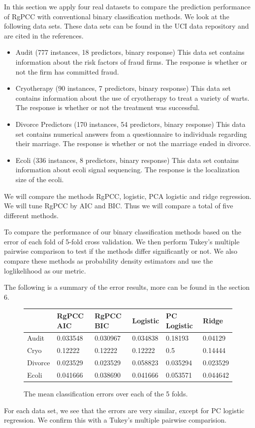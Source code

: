 \documentclass[main.tex]{subfiles}
\begin{document}
In this section we apply four real datasets to compare the prediction performance of RgPCC with conventional binary classification methods. We look at the following data sets. These data sets can be found in the UCI data repository and are cited in the references.
\begin{itemize}
	\item Audit (777 instances, 18 predictors, binary response) This data set contains information about the risk factors of fraud firms. The response is whether or not the firm has committed fraud. \cite{audit}
    \item Cryotherapy (90 instances, 7 predictors, binary response) This data set contains information about the use of cryotherapy to treat a variety of warts. The response is whether or not the treatment was successful. \cite{cryo}
    \item Divorce Predictors (170 instances, 54 predictors, binary response) This data set contains numerical answers from a questionnaire to individuals regarding their marriage. The response is whether or not the marriage ended in divorce. \cite{divorce}
    \item Ecoli (336 instances, 8 predictors, binary response) This data set contains information about ecoli signal sequencing. The response is the localization size of the ecoli. \cite{ecoli}
\end{itemize}

We will compare the methods RgPCC, logistic, PCA logistic and ridge regression. We will tune RgPCC by AIC and BIC. Thus we will compare a total of five different methods. 

To compare the performance of our binary classification methods based on the error of each fold of 5-fold cross validation. We then perform Tukey's multiple pairwise comparison to test if the methods differ significantly or not. We also compare these methods as probability density estimators and use the loglikelihood as our metric.

The following is a summary of the error results, more can be found in the section 6.

\begin{figure}[H]
	\begin{tabular}{l l l l l l} \hline
    & RgPCC AIC & RgPCC BIC & Logistic & PC Logistic & Ridge \\ \hline
    \rowcolor{LightCyan}
    Audit & 0.033548 & 0.030967 & 0.034838    & 0.18193 & 0.04129\\
    Cryo & 0.12222 & 0.12222 & 0.12222         &  0.5 & 0.14444 \\
    \rowcolor{LightCyan}
    Divorce & 0.023529 & 0.023529 & 0.058823 & 0.035294 & 0.023529\\
    Ecoli & 0.041666 & 0.038690 & 0.041666  & 0.053571 & 0.044642\\ \hline
	\end{tabular}
	\caption{The mean classification errors over each of the 5 folds.}
\end{figure}
For each data set, we see that the errors are very similar, except for PC logistic regression. We confirm this with a Tukey's multiple pairwise comparision.
\end{document}
